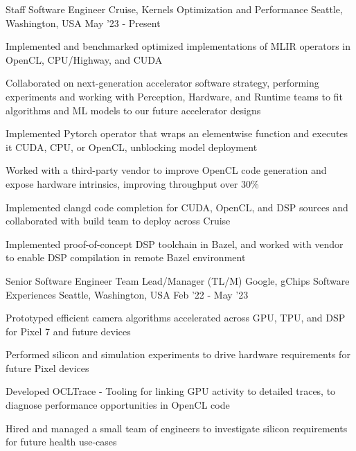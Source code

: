 \begin{cventries}
\cventry
    {Staff Software Engineer} %
    {Cruise, Kernels Optimization and Performance} %
    {Seattle, Washington, USA} %
    {May '23 - Present} %
    {
        \begin{cvitems}
          \item Implemented and benchmarked optimized implementations of MLIR operators in OpenCL, CPU/Highway, and CUDA
          \item Collaborated on next-generation accelerator software strategy, performing experiments and working with Perception, Hardware, and Runtime teams to fit algorithms and ML models to our future accelerator designs
          \item Implemented Pytorch operator that wraps an elementwise function and executes it CUDA, CPU, or OpenCL, unblocking model deployment
          \item Worked with a third-party vendor to improve OpenCL code generation and expose hardware intrinsics, improving throughput over 30\%
          \item Implemented clangd code completion for CUDA, OpenCL, and DSP sources and collaborated with build team to deploy across Cruise
          \item Implemented proof-of-concept DSP toolchain in Bazel, and worked with vendor to enable DSP compilation in remote Bazel environment
        \end{cvitems}
    }
\vspace{4mm}
\cventry
    {Senior Software Engineer Team Lead/Manager (TL/M)} %
    {Google, gChips Software Experiences} %
    {Seattle, Washington, USA} %
    {Feb '22 - May '23} %
    {
        \begin{cvitems}
          \item Prototyped efficient camera algorithms accelerated across GPU, TPU, and DSP for Pixel 7 and future devices
          \item Performed silicon and simulation experiments to drive hardware requirements for future Pixel devices
          \item Developed OCLTrace - Tooling for linking GPU activity to detailed traces, to diagnose performance opportunities in OpenCL code
          \item Hired and managed a small team of engineers to investigate silicon requirements for future health use-cases
        \end{cvitems}
}
\end{cventries}
